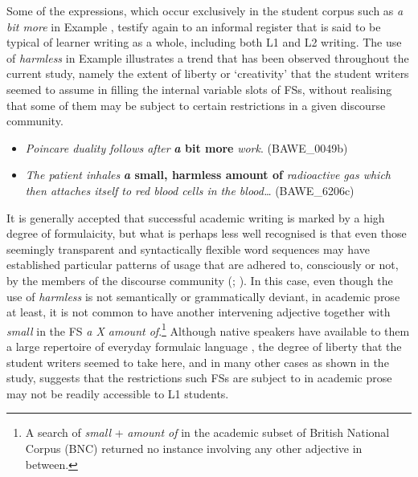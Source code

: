 \documentclass[output=paper]{langsci/langscibook}
\begin{document}
Some of the expressions, which occur exclusively in the student corpus such as \textit{a bit more} in Example , testify again to an informal register that is said to be typical of learner writing as a whole, including both L1 and L2 writing. The use of \textit{harmless} in Example  illustrates a trend that has been observed throughout the current study, namely the extent of liberty or ‘creativity’ that the student writers seemed to assume in filling the internal variable slots of FSs, without realising that some of them may be subject to certain restrictions in a given discourse community. 

\begin{itemize}
\item \begin{styleListParagraph}
\textit{Poincare duality follows after} \textbf{\textit{a} \textbf{bit} \textbf{more}} \textit{work}. (BAWE\_0049b)
\end{styleListParagraph}
\end{itemize}

\begin{itemize}
\item \begin{styleListParagraph}
\textit{The patient inhales} \textbf{\textit{a} \textbf{small,} \textbf{harmless} \textbf{amount} \textbf{of}} \textit{radioactive gas which then attaches itself to red blood cells in the blood…} (BAWE\_6206c) 
\end{styleListParagraph}
\end{itemize}

It is generally accepted that successful academic writing is marked by a high degree of formulaicity, but what is perhaps less well recognised is that even those seemingly transparent and syntactically flexible word sequences may have established particular patterns of usage that are adhered to, consciously or not, by the members of the discourse community (\citealt{Pérez-Llantada2014}; \citealt{Wang2018}). In this case, even though the use of \textit{harmless} is not semantically or grammatically deviant, in academic prose at least, it is not common to have another intervening adjective together with \textit{small} in the FS \textit{a X amount of}.\footnote{\textrm{A search of} \textrm{\textit{small} }\textrm{+} \textrm{\textit{amount of} }\textrm{in the academic subset of British National Corpus (BNC) returned no instance involving any other adjective in between.}} Although native speakers have available to them a large repertoire of everyday formulaic language \citep{Sinclair1991}, the degree of liberty that the student writers seemed to take here, and in many other cases as shown in the study, suggests that the restrictions such FSs are subject to in academic prose may not be readily accessible to L1 students.
\end{document}
